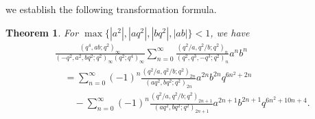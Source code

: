 \documentclass[reqno,12pt]{amsart}
\newtheorem{theorem}{Theorem}[section]%
\theoremstyle{remark}
\numberwithin{equation}{section}
\begin{document}
we establish the following transformation formula. 
\begin{theorem}\label{T7}
For $\max\{|a^2|,|aq^2|,|bq^2|,|ab|\}<1$, we have
\begin{align*}
&\frac{\left(q^4,ab;q^2\right)_{\infty}}
{\left(-q^2,a^2,bq^2;q^2\right)_{\infty}\left(q^2;q^4\right)_{\infty}}
\sum_{n=0}^{\infty}\frac{\left(q^2/a,q^2/b;q^2\right)_n}
{\left(q^2,q^3,-q^3;q^2\right)_n}a^nb^n\\
&\quad =\sum_{n=0}^{\infty}\left(-1\right)^n
\frac{\left(q^2/a,q^2/b;q^2\right)_{2n}}{\left(aq^2,bq^2;q^2\right)_{2n}}
a^{2n}b^{2n}q^{6n^2+2n}\\
&\qquad-
\sum_{n=0}^{\infty}\left(-1\right)^n
\frac{\left(q^2/a,q^2/b;q^2\right)_{2n+1}}{\left(aq^2,bq^2;q^2\right)_{2n+1}}
a^{2n+1}b^{2n+1}q^{6n^2+10n+4}.
\end{align*}
\end{theorem}
\end{document}
